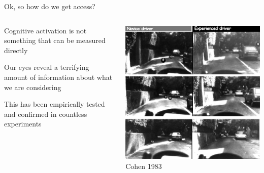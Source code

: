 \documentclass{beamer}
\begin{document}
\begin{frame}{Ok, so how do we get access?}

\begin{columns}
\begin{column}{0.45\textwidth}
Cognitive activation is not something that can be measured directly \vspace{4mm}

Our eyes reveal a terrifying amount of information about what we are considering \vspace{4mm}

This has been empirically tested and confirmed in countless experiments
\end{column}
\begin{column}{0.5\textwidth}
\begin{center}
\includegraphics[scale=0.45]{img/car_eye.jpg}
{\tiny Cohen 1983}
\end{center}
\end{column}
\end{columns}

\end{frame}
\end{document}
